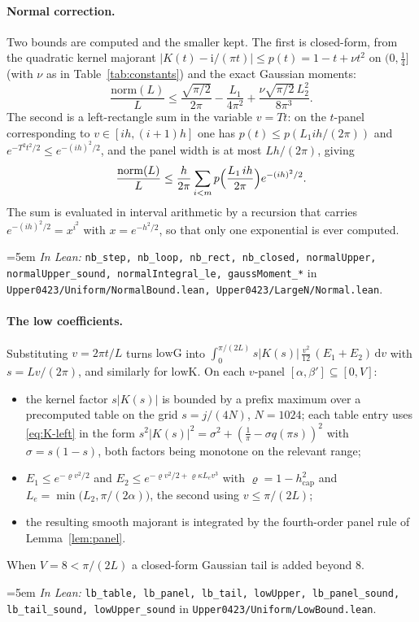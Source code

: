 \documentclass[11pt,a4paper]{article}
\theoremstyle{definition}
\newcommand{\ii}{\mathrm{i}}
\newcommand{\dd}{\,\mathrm{d}}
\newcommand{\kap}{\kappa}
\newcommand{\Lean}[1]{\texttt{#1}}
\newcommand{\file}[1]{\texttt{#1}}
\newcommand{\formal}[2]{%
  \par\smallskip
  \begingroup\small\raggedright\emergencystretch=5em
  \noindent\textit{In Lean:} \Lean{#1} in \file{#2}.\par
  \endgroup\smallskip}
\begin{document}
\paragraph{Normal correction.} Two bounds are computed and the smaller kept. The
first is closed-form, from the quadratic kernel majorant
$|K(t)-\ii/(\pi t)|\le p(t)=1-t+\nu t^2$ on $(0,\tfrac14]$ (with $\nu$ as in
Table~\ref{tab:constants}) and the exact Gaussian moments:
\[
  \frac{\mathrm{norm}(L)}{L}\le
  \frac{\sqrt{\pi/2}}{2\pi}-\frac{L_1}{4\pi^2}
  +\frac{\nu\sqrt{\pi/2}\,L_2^2}{8\pi^3} .
\]
The second is a left-rectangle sum in the variable $v=Tt$: on the $t$-panel
corresponding to $v\in[ih,(i{+}1)h]$ one has $p(t)\le p(L_1 ih/(2\pi))$ and
$e^{-T^2t^2/2}\le e^{-(ih)^2/2}$, and the panel width is at most $Lh/(2\pi)$,
giving
\[
  \frac{\mathrm{norm}(L)}{L}\le\frac{h}{2\pi}
  \sum_{i<m}p\Bigl(\frac{L_1\,ih}{2\pi}\Bigr)e^{-(ih)^2/2} .
\]
The sum is evaluated in interval arithmetic by a recursion that carries
$e^{-(ih)^2/2}=x^{i^2}$ with $x=e^{-h^2/2}$, so that only one exponential is ever
computed.
\formal{nb\_step, nb\_loop, nb\_rect, nb\_closed, normalUpper, normalUpper\_sound, normalIntegral\_le, gaussMoment\_*}{Upper0423/Uniform/NormalBound.lean, Upper0423/LargeN/Normal.lean}

\paragraph{The low coefficients.} Substituting $v=2\pi t/L$ turns
$\mathrm{lowG}$ into $\int_0^{\pi/(2L)}
s|K(s)|\,\tfrac{v^2}{12}\,(E_1+E_2)\dd v$ with $s=Lv/(2\pi)$, and similarly for
$\mathrm{lowK}$. On each $v$-panel $[\alpha,\beta']\subseteq[0,V]$:
\begin{itemize}[leftmargin=1.6em]
\item the kernel factor $s|K(s)|$ is bounded by a prefix maximum over a
  precomputed table on the grid $s=j/(4N)$, $N=1024$; each table entry uses
  \eqref{eq:K-left} in the form
  $s^2|K(s)|^2=\sigma^2+(\tfrac1\pi-\sigma q(\pi s))^2$ with
  $\sigma=s(1-s)$, both factors being monotone on the relevant range;
\item $E_1\le e^{-\varrho v^2/2}$ and
  $E_2\le e^{-\varrho v^2/2+\varrho\kap L_e v^3}$ with
  $\varrho=1-h_{\mathrm{cap}}^2$ and
  $L_e=\min\bigl(L_2,\pi/(2\alpha)\bigr)$, the second using
  $v\le\pi/(2L)$;
\item the resulting smooth majorant is integrated by the fourth-order panel rule
  of Lemma~\ref{lem:panel}.
\end{itemize}
When $V=8<\pi/(2L)$ a closed-form Gaussian tail is added beyond $8$.
\formal{lb\_table, lb\_panel, lb\_tail, lowUpper, lb\_panel\_sound, lb\_tail\_sound, lowUpper\_sound}{Upper0423/Uniform/LowBound.lean}
\end{document}
